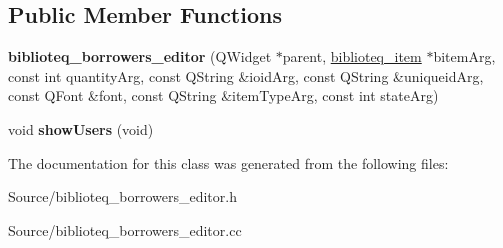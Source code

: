 \subsection*{Public Member Functions}
\begin{DoxyCompactItemize}
\item 
{\bfseries biblioteq\+\_\+borrowers\+\_\+editor} (Q\+Widget $\ast$parent, \hyperlink{classbiblioteq__item}{biblioteq\+\_\+item} $\ast$bitem\+Arg, const int quantity\+Arg, const Q\+String \&ioid\+Arg, const Q\+String \&uniqueid\+Arg, const Q\+Font \&font, const Q\+String \&item\+Type\+Arg, const int state\+Arg)\hypertarget{classbiblioteq__borrowers__editor_a1215ea5da84e858cb1438c537f32d7da}{}\label{classbiblioteq__borrowers__editor_a1215ea5da84e858cb1438c537f32d7da}

\item 
void {\bfseries show\+Users} (void)\hypertarget{classbiblioteq__borrowers__editor_a300cf57e5ddbe8734f1c8e8ff05a5f1a}{}\label{classbiblioteq__borrowers__editor_a300cf57e5ddbe8734f1c8e8ff05a5f1a}

\end{DoxyCompactItemize}


The documentation for this class was generated from the following files\+:\begin{DoxyCompactItemize}
\item 
Source/biblioteq\+\_\+borrowers\+\_\+editor.\+h\item 
Source/biblioteq\+\_\+borrowers\+\_\+editor.\+cc\end{DoxyCompactItemize}
